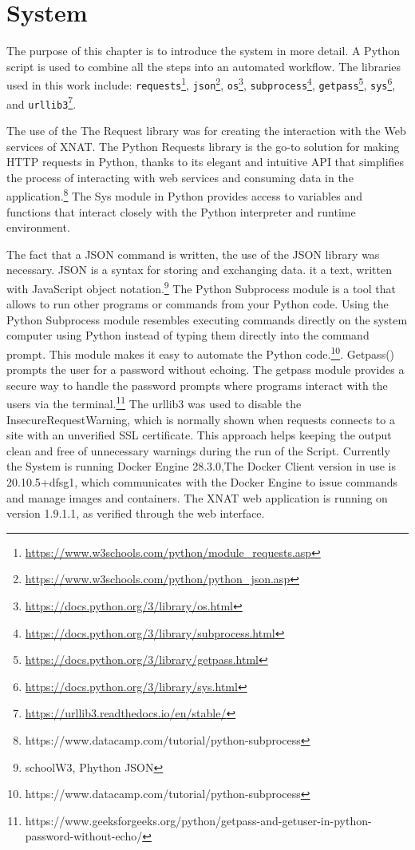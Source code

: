 \chapter{System}

The purpose of this chapter is to introduce the system in more detail. A Python script is used to combine all the steps into an automated workflow. The libraries used in this work include: \texttt{requests}\footnote{\url{https://www.w3schools.com/python/module_requests.asp}}, \texttt{json}\footnote{\url{https://www.w3schools.com/python/python_json.asp}}, \texttt{os}\footnote{\url{https://docs.python.org/3/library/os.html}}, \texttt{subprocess}\footnote{\url{https://docs.python.org/3/library/subprocess.html}}, \texttt{getpass}\footnote{\url{https://docs.python.org/3/library/getpass.html}}, \texttt{sys}\footnote{\url{https://docs.python.org/3/library/sys.html}}, and \texttt{urllib3}\footnote{\url{https://urllib3.readthedocs.io/en/stable/}}.

The use of the The Request library was for creating the interaction with the Web services of XNAT. The Python Requests library is the go-to solution for making HTTP requests in Python, thanks to its elegant and intuitive API that simplifies the process of interacting with web services and consuming data in the application.\footnote{https://www.datacamp.com/tutorial/python-subprocess} The Sys module in Python provides access to variables and functions that interact closely with the Python interpreter and runtime environment. 

The fact that a JSON command is written, the use of the JSON library was necessary. JSON is a syntax for storing and exchanging data. it a text, written with JavaScript object notation.\footnote{schoolW3, Phython JSON}
The Python Subprocess module is a tool that allows to run other programs or commands from your Python code. Using the Python Subprocess module resembles executing commands directly on the system computer using Python instead of typing them directly into the command prompt. This module makes it easy to automate the Python code.\footnote{https://www.datacamp.com/tutorial/python-subprocess}. Getpass() prompts the user for a password without echoing. The getpass module provides a secure way to handle the password prompts where programs interact with the users via the terminal.\footnote{https://www.geeksforgeeks.org/python/getpass-and-getuser-in-python-password-without-echo/}
 The urllib3 was used to disable the InsecureRequestWarning, which is normally shown when requests connects to a site with an unverified SSL certificate. This approach helps keeping the output clean and free of unnecessary warnings during the run of the Script.
 Currently the System is running Docker Engine 28.3.0,The Docker Client version in use is 20.10.5+dfsg1, which communicates with the Docker Engine to issue commands and manage images and containers. The XNAT web application is running on version 1.9.1.1, as verified through the web interface. 
 

